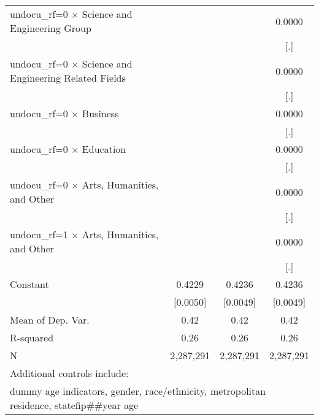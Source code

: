 \begin{table}[htbp]
\begin{tabular}{l*{3}{c}}
\addlinespace
undocu\_rf=0 $\times$ Science and Engineering Group&                     &                     &      0.0000         \\
                    &                     &                     &         [.]         \\
\addlinespace
undocu\_rf=0 $\times$ Science and Engineering Related Fields&                     &                     &      0.0000         \\
                    &                     &                     &         [.]         \\
\addlinespace
undocu\_rf=0 $\times$ Business&                     &                     &      0.0000         \\
                    &                     &                     &         [.]         \\
\addlinespace
undocu\_rf=0 $\times$ Education&                     &                     &      0.0000         \\
                    &                     &                     &         [.]         \\
\addlinespace
undocu\_rf=0 $\times$ Arts, Humanities, and Other&                     &                     &      0.0000         \\
                    &                     &                     &         [.]         \\
\addlinespace
undocu\_rf=1 $\times$ Arts, Humanities, and Other&                     &                     &      0.0000         \\
                    &                     &                     &         [.]         \\
\addlinespace
Constant            &      0.4229\sym{***}&      0.4236\sym{***}&      0.4236\sym{***}\\
                    &    [0.0050]         &    [0.0049]         &    [0.0049]         \\
\midrule
Mean of Dep. Var.   &        0.42         &        0.42         &        0.42         \\
R-squared           &        0.26         &        0.26         &        0.26         \\
N                   &   2,287,291         &   2,287,291         &   2,287,291         \\
\bottomrule
\multicolumn{4}{l}{\footnotesize Additional controls include:}\\
\multicolumn{4}{l}{\footnotesize dummy age indicators, gender, race/ethnicity, metropolitan residence, statefip##year age}\\

\end{tabular}
\end{table}
